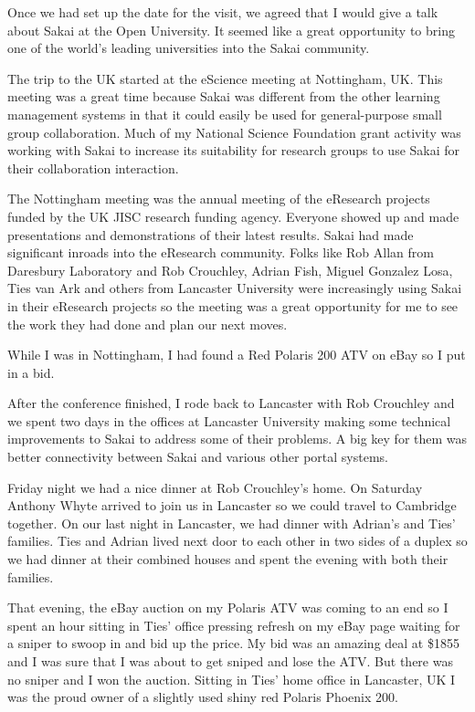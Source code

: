 \documentclass[12pt]{book}
\begin{document}
Once we had set up the date for the visit, we agreed that
I would give a talk about Sakai at the Open University.
It seemed like a great opportunity to bring one of the
world's leading universities into the Sakai community.

The trip to the UK started at the eScience meeting at
Nottingham, UK.  This meeting was a great time because Sakai
was different from the other learning management systems
in that it could easily be used for general-purpose
small group collaboration.  Much of my National
Science Foundation grant activity was working with
Sakai to increase its suitability for research groups
to use Sakai for their collaboration interaction.

The Nottingham meeting was the annual meeting of the
eResearch projects funded by the UK JISC
research funding agency.  Everyone showed up and made
presentations and demonstrations of their latest results.
Sakai had made significant inroads into the eResearch
community.  Folks like Rob Allan from Daresbury Laboratory
and Rob Crouchley, Adrian Fish, Miguel Gonzalez Losa,
Ties van Ark
and others from Lancaster University were increasingly
using Sakai in their eResearch projects so the meeting
was a great opportunity for me to see the work they had
done and plan our next moves.

While I was in Nottingham, I had found a Red Polaris 200
ATV on eBay so I put in a bid.

After the conference finished,
I rode back to Lancaster with Rob Crouchley and
we spent two days in the offices at Lancaster University
making some technical improvements to Sakai to address some of their
problems.  A big key for them was
better connectivity between Sakai and various other portal
systems.

Friday night we had a nice dinner at Rob
Crouchley's home.   On Saturday Anthony Whyte
arrived to join us in Lancaster so we could
travel to Cambridge together.
On our last night in Lancaster, we had dinner
with Adrian's and Ties' families.
Ties and Adrian lived next door to each other
in two sides of a duplex so
we had dinner at their combined houses and spent
the evening with both their families.

That evening, the eBay auction on my Polaris
ATV was coming to an end so I spent an hour
sitting in Ties' office pressing refresh on my
eBay page waiting for a sniper
to swoop in and bid up the price.   My bid was an amazing
deal at \$1855 and I was sure that I was about
to get sniped and lose the ATV.  But there was no
sniper and I won the auction.  Sitting in Ties'
home office in Lancaster, UK I was the proud
owner of a slightly used shiny red Polaris Phoenix 200.
\end{document}
